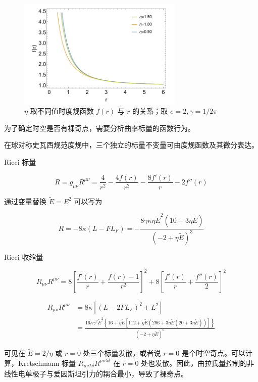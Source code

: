 \documentclass[aps,prl,preprint,groupedaddress,showkeys]{revtex4-2}
\begin{document}
\begin{figure}[htbp]
    \centering
    \includegraphics[width=0.7\textwidth]{fig/fig5.png}
    \caption{$\eta$ 取不同值时度规函数 $f(r)$ 与 $r$ 的关系；取 $e=2,\gamma=1/2\pi$}
\end{figure}  

为了确定时空是否有裸奇点，需要分析曲率标量的函数行为。

在球对称史瓦西规范度规中，三个独立的标量不变量可由度规函数及其微分表达。

Ricci 标量

$$
R
=g_{\mu\nu} R^{\mu\nu}
=\frac{4 }{r^2 } - \frac{4f(r) }{r^2 } - \frac{8f'(r) }{r } - 2f''(r) 
$$

通过变量替换 $\tilde{E}=E^2$ 可以写为

$$
R
=-8\kappa \left(L-FL_F \right)
=-\frac{8\gamma\kappa \eta\tilde{E}^2\left(10+3\eta\tilde{E} \right) }{\left(-2+\eta\tilde{E} \right)^3 }
$$

Ricci 收缩量

$$
R_{\mu\nu} R^{\mu\nu}
=8\left[\frac{f'(r) }{r } + \frac{f(r)-1 }{r^2 }  \right]^2 + 8 \left[\frac{f'(r) }{r } + \frac{f''(r) }{2 }  \right]^2
$$

$$
\begin{aligned}
    R_{\mu\nu} R^{\mu\nu}
    &=8\kappa\left[\left(L - 2FL_F \right)^2 + L^2 \right] \\
    &=\frac{16\kappa \gamma^2 \tilde{E}^2 \left\{16+\eta \tilde{E}\left[112+\eta\tilde{E}\left(296+3\eta \tilde{E}\left(20+3\eta\tilde{E} \right) \right) \right] \right\} }{\left(-2+\eta\tilde{E} \right)^6 }
\end{aligned}
$$

可见在 $\tilde{E}=2/\eta $ 或 $r=0$ 处三个标量发散，或者说 $r=0$ 是个时空奇点。可以计算，Kretschmann 标量 $R_{\mu\nu\lambda\delta}R^{\mu\nu\lambda\delta}  $ 在 $r=0$ 处也发散。因此，由拉氏量控制的非线性电单极子与爱因斯坦引力的耦合最小，导致了裸奇点。
\end{document}
